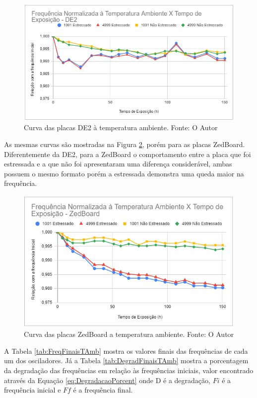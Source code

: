 \begin{figure}[H]
    \centering
    \includegraphics[scale=0.75]{figures/Resultados/TAmbDE2}
    \caption{Curva das placas DE2 à temperatura ambiente. Fonte: O Autor}
    \label{fig:TAmbDE2}
\end{figure}

As mesmas curvas são mostradas na Figura \ref{fig:TAmbZedBoard}, porém para as placas ZedBoard. Diferentemente da DE2, para a ZedBoard o comportamento entre a placa que foi estressada e a que não foi apresentaram uma diferença considerável, ambas possuem o mesmo formato porém a estressada demonstra uma queda maior na frequência.

\begin{figure}[H]
    \centering
    \includegraphics[scale=0.75]{figures/Resultados/TAmbZedBoard}
    \caption{Curva das placas ZedBoard a temperatura ambiente. Fonte: O Autor}
    \label{fig:TAmbZedBoard}
\end{figure}

A Tabela \ref{tab:FreqFinaisTAmb} mostra os valores finais das frequências de cada um dos osciladores. Já a Tabela \ref{tab:DegradFinaisTAmb} mostra a porcentagem da degradação das frequências em relação às frequências iniciais, valor encontrado através da Equação \ref{eq:DegradacaoPorcent} onde D é a degradação, $F\scriptstyle{i}$ é a frequência inicial e $F\scriptstyle{f}$ é a frequência final.

